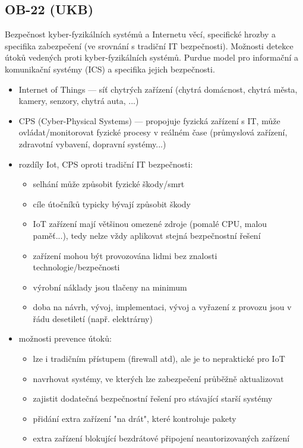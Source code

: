\subsection{OB-22 (UKB)}
Bezpečnost kyber-fyzikálních systémů a Internetu věcí, specifické hrozby a specifika zabezpečení (ve srovnání s tradiční IT bezpečnosti). Možnosti detekce útoků vedených proti kyber-fyzikálních systémů. Purdue model pro informační a komunikační systémy (ICS) a specifika jejich bezpečnosti.

\begin{itemize}
	\item Internet of Things --- síť chytrých zařízení (chytrá domácnost, chytrá města, kamery, senzory, chytrá auta, ...)
	\item CPS (Cyber-Physical Systems) --- propojuje fyzická zařízení s IT, může ovládat/monitorovat fyzické procesy v reálném čase (průmyslová zařízení, zdravotní vybavení, dopravní systémy...)
	\item rozdíly Iot, CPS oproti tradiční IT bezpečnosti:
	\begin{itemize}
		\item selhání může způsobit fyzické škody/smrt
		\item cíle útočníků typicky bývají způsobit škody
		\item IoT zařízení mají většinou omezené zdroje (pomalé CPU, malou paměť...), tedy nelze vždy aplikovat stejná bezpečnostní řešení
		\item zařízení mohou být provozována lidmi bez znalosti technologie/bezpečnosti
		\item výrobní náklady jsou tlačeny na minimum
		\item doba na návrh, vývoj, implementaci, vývoj a vyřazení z provozu jsou v řádu desetiletí (např. elek\-trár\-ny)
	\end{itemize}
	\item možnosti prevence útoků:
	\begin{itemize}
		\item lze i tradičním přístupem (firewall atd), ale je to nepraktické pro IoT
		\item navrhovat systémy, ve kterých lze zabezpečení průběžně aktualizovat
		\item zajistit dodatečná bezpečnostní řešení pro stávající starší systémy
		\item přidání extra zařízení "na drát", které kontroluje pakety
		\item extra zařízení blokující bezdrátové připojení neautorizovaných zařízení

\end{itemize}
\end{itemize}
